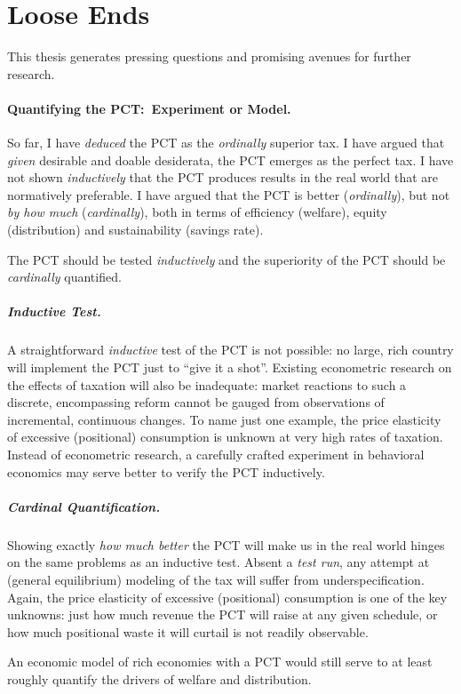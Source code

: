 \section{Loose Ends} \label{sec:LooseEnds} This thesis generates pressing questions and promising avenues for further research.

\paragraph{Quantifying the PCT:\ Experiment or Model.} So far, I have \emph{deduced} the PCT as the \emph{ordinally} superior tax.
I have argued that \emph{given} desirable and doable desiderata, the PCT emerges as the perfect tax.
I have not shown \emph{inductively} that the PCT produces results in the real world that are normatively preferable.
I have argued that the PCT is better (\emph{ordinally}), but not \emph{by how much} (\emph{cardinally}), both in terms of efficiency (welfare), equity (distribution) and sustainability (savings rate).

	The PCT should be tested \emph{inductively} and the superiority of the PCT should be \emph{cardinally} quantified.

\subparagraph{Inductive Test.} A straightforward \emph{inductive} test of the PCT is not possible:
no large, rich country will implement the PCT just to ``give it a shot''.
Existing econometric research on the effects of taxation will also be inadequate:
market reactions to such a discrete, encompassing reform cannot be gauged from observations of incremental, continuous changes.
To name just one example, the price elasticity of excessive (positional) consumption is unknown at very high rates of taxation.
Instead of econometric research, a carefully crafted experiment in behavioral economics may serve better to verify the PCT inductively.

\subparagraph{Cardinal Quantification.} Showing exactly \emph{how much better} the PCT will make us in the real world hinges on the same problems as an inductive test.
Absent a \emph{test run}, any attempt at (general equilibrium) modeling of the tax will suffer from underspecification.
Again, the price elasticity of excessive (positional) consumption is one of the key unknowns:
just how much revenue the PCT will raise at any given schedule, or how much positional waste it will curtail is not readily observable.

An economic model of rich economies with a PCT would still serve to at least roughly quantify the drivers of welfare and distribution.


